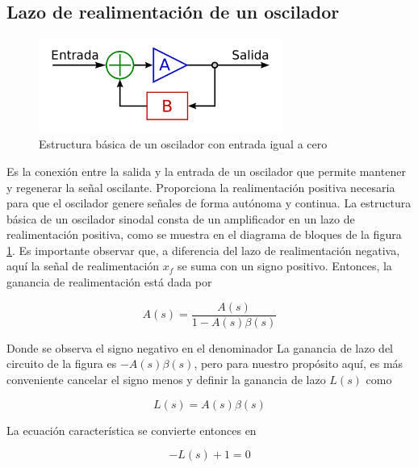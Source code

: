     \subsection{Lazo de realimentación de un oscilador}

        
        \begin{figure}[H]
            \centering
            \includegraphics[width=8cm]{Imagenes/1.png}
            \caption{Estructura básica de un oscilador con entrada igual a cero}
            \label{fig:1}
        \end{figure}
        
        Es la conexión entre la salida y la entrada de un oscilador que permite mantener y regenerar la señal oscilante. Proporciona la realimentación positiva necesaria para que el oscilador genere señales de forma autónoma y continua. La estructura básica de un oscilador sinodal consta de un amplificador en un lazo de realimentación positiva, como se muestra en el diagrama de bloques de la figura \ref{fig:1}. Es importante observar que, a diferencia del lazo de realimentación negativa, aquí la señal de realimentación \(x_f\) se suma con un signo positivo. Entonces, la ganancia de realimentación está dada por


        \begin{equation}
            A(s) = \frac{A(s)}{1 - A(s)\beta(s)} \label{eqn:7}
        \end{equation}

        Donde se observa el signo negativo en el denominador
        La ganancia de lazo del circuito de la figura es \( -A(s)\beta(s) \), pero para nuestro propósito aquí, es más conveniente cancelar el signo menos y definir la ganancia de lazo \( L(s) \) como

        \begin{equation}
            L(s) = A(s)\beta(s)
        \end{equation}


        La ecuación característica se convierte entonces en

        \begin{equation}
            -L(s) + 1 = 0
        \end{equation}
        
